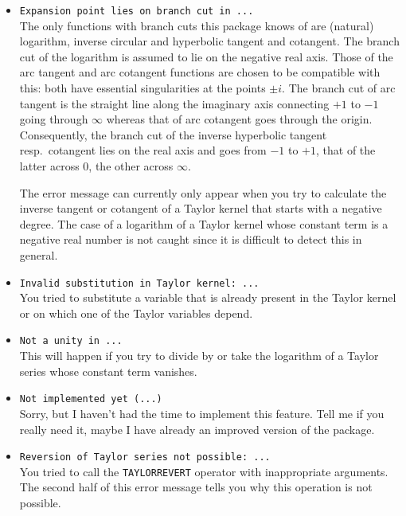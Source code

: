 \begin{itemize}
\item \verb|Expansion point lies on branch cut in ...|\\
    The only functions with branch cuts this package knows of are
    (natural) logarithm, inverse circular and hyperbolic tangent and
    cotangent.  The branch cut of the logarithm is assumed to lie on
    the negative real axis.  Those of the arc tangent and arc
    cotangent functions are chosen to be compatible with this: both
    have essential singularities at the points $\pm i$.  The branch
    cut of arc tangent is the straight line along the imaginary axis
    connecting $+1$ to $-1$ going through $\infty$ whereas that of arc
    cotangent goes through the origin.  Consequently, the branch cut
    of the inverse hyperbolic tangent resp.\ cotangent lies on the
    real axis and goes from $-1$ to $+1$, that of the latter across
    $0$, the other across $\infty$.

    The error message can currently only appear when you try to
    calculate the inverse tangent or cotangent of a Taylor
    kernel that starts with a negative degree.
    The case of a logarithm of a Taylor kernel whose constant term
    is a negative real number is not caught since it is
    difficult to detect this in general.

\item \verb|Invalid substitution in Taylor kernel: ...|\\
    You tried to substitute a variable that is already present in the
    Taylor kernel or on which one of the Taylor variables depend.

\item \verb|Not a unity in ...|\\
    This will happen if you try to divide by or take the logarithm of
    a Taylor series whose constant term vanishes.

\item \verb|Not implemented yet (...)|\\
    Sorry, but I haven't had the time to implement this feature.
    Tell me if you really need it, maybe I have already an improved
    version of the package.

\item \verb|Reversion of Taylor series not possible: ...|\\
    You tried to call the \verb|TAYLORREVERT| operator with
    inappropriate arguments. The second half of this error message
    tells you why this operation is not possible.


\end{itemize}
